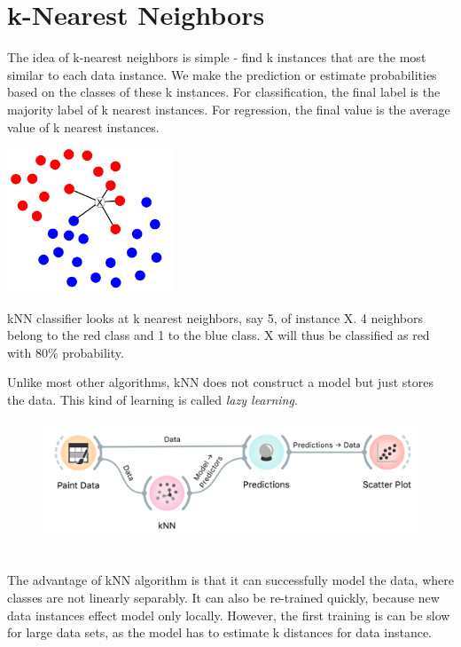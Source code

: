 \chapter{k-Nearest Neighbors}
\label{ch:knn}

The idea of k-nearest neighbors is simple - find k instances that are the most similar to each data instance. We make the prediction or estimate probabilities based on the classes of these k instances. For classification, the final label is the majority label of k nearest instances. For regression, the final value is the average value of k nearest instances.

\begin{marginfigure}
    \includegraphics[width=50mm]{knn.png}%
    \caption{kNN classifier looks at k nearest neighbors, say 5, of instance X. 4 neighbors belong to the red class and 1 to the blue class. X will thus be classified as red with 80\% probability.}
\end{marginfigure}

Unlike most other algorithms, kNN does not construct a model but just stores the data. This kind of learning is called \textit{lazy learning}.

\begin{figure}[h]
    \centering
    \includegraphics[width=\textwidth]{workflow.png}
    \caption{$\;$}
\end{figure}

The advantage of kNN algorithm is that it can successfully model the data, where classes are not linearly separably. It can also be re-trained quickly, because new data instances effect model only locally. However, the first training is can be slow for large data sets, as the model has to estimate k distances for data instance.


